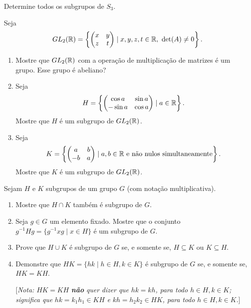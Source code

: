 \documentclass[12pt]{exam}
\begin{document}
    \questao{} Determine todos os subgrupos de $S_3$.

    \vspace{.3cm}

    \questao{} Seja
    \[
      GL_2(\mathbb{R}) = \left\{ \begin{pmatrix}
          x & y\\z & t
      \end{pmatrix} \mid x, y, z, t \in \mathbb{R},\ \det(A) \ne 0\right\}.
    \]
    \begin{enumerate}[label=({\alph*})]
      \item Mostre que $GL_2(\mathbb{R})$ com a opera\c{c}\~ao de multiplica\c{c}\~ao de matrizes \'e um grupo. Esse grupo \'e abeliano?

      \item Seja
      \[
          H = \left\{ \begin{pmatrix}
              \cos a & \sin a\\ - \sin a & \cos a
          \end{pmatrix} \mid a \in \mathbb{R}\right\}.
      \]
      Mostre que $H$ \'e um subgrupo de $GL_2(\mathbb{R})$.

      \item Seja
      \[
          K = \left\{ \begin{pmatrix}
              a & b\\ -b & a
          \end{pmatrix} \mid a, b \in \mathbb{R} \mbox{ e n\~ao nulos simultaneamente}\right\}.
      \]
      Mostre que $K$ \'e um subgrupo de $GL_2(\mathbb{R})$.
    \end{enumerate}

    \questao{} Sejam $H$ e $K$ subgrupos de um grupo $G$ (com nota{\c c}{\~a}o
    multiplicativa).
    \begin{enumerate}[label=({\alph*})]
      \item Mostre que $H\cap K$ tamb{\'e}m {\'e} subgrupo de $G$.

      \item Seja $g\in G$ um elemento fixado. Mostre que o conjunto
      $g^{-1}Hg=\{ g^{-1}xg \mid x\in H \} $ {\'e} um subgrupo de $G$.

      \item Prove que $H\cup K$ {\'e} subgrupo de $G$ se, e somente se,
      $H\subseteq K$ ou $K\subseteq H$.

      \item Demonstre que $HK=\{hk \mid h\in H, k\in K\}$ {\'e} subgrupo
      de $G$ se, e somente se, $HK=KH$.

      [\emph{Nota: $HK=KH$ \textbf{n{\~a}o} quer dizer que $hk=kh$,
      para todo $h\in H, k\in K$; significa que $hk=k_1h_1 \in KH$ e $kh=h_2k_2 \in
      HK$, para todo $h\in H, k\in K$.}]
    \end{enumerate}
\end{document}
